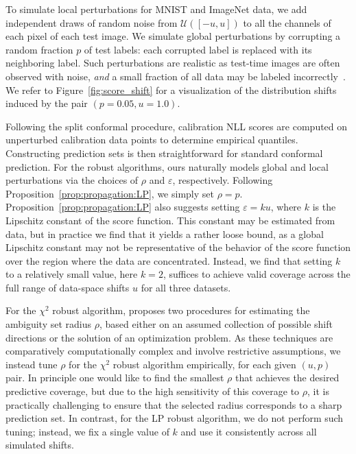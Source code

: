 \documentclass[11pt,a4paper]{article}
\begin{document}
To simulate local perturbations for MNIST and ImageNet data, we add independent draws of random noise from $\mathcal{U}([-u, u])$ to all the channels of each pixel of each test image. We simulate global perturbations by corrupting a random fraction $p$ of test labels: each corrupted label is replaced with its neighboring label. Such perturbations are realistic as test-time images are often observed with noise, \textit{and} a small fraction of all data may be labeled incorrectly~\cite{Feldman_2023, Zargarbashi_2024}. We refer to Figure~\ref{fig:score_shift} for a visualization of the distribution shifts induced by the pair $(p =0.05, u=1.0)$.

Following the split conformal procedure, calibration NLL scores are computed on unperturbed calibration data points to determine empirical quantiles. Constructing prediction sets is then straightforward for standard conformal prediction. For the robust algorithms, ours naturally models global and local perturbations via the choices of $\rho$ and $\varepsilon$, respectively. 
%
Following Proposition~\ref{prop:propagation:LP}, we simply set $\rho = p$. Proposition~\ref{prop:propagation:LP} also suggests setting $\varepsilon = ku$, where $k$ is the Lipschitz constant of the score function. This constant may be estimated from data, but in practice we find that it yields a rather loose bound, as a global Lipschitz constant may not be representative of the behavior of the score function over the region where the data are concentrated. Instead, we find that setting $k$ to a relatively small value, here $k=2$, suffices to achieve valid coverage across the full range of data-space shifts $u$ for all three datasets. 

For the $\chi^2$ robust algorithm, \cite{cauchois2024robust} proposes two procedures for estimating the ambiguity set radius $\rho$, based either on an assumed collection of possible shift directions or the solution of an optimization problem. 
%
%
%
As these techniques are comparatively computationally complex and involve restrictive assumptions, we instead tune $\rho$ for the $\chi^2$ robust algorithm empirically, for each given $(u, p)$ pair. In principle one would like to find the smallest $\rho$ that achieves the desired predictive coverage, but due to the high sensitivity of this coverage to $\rho$, it is practically challenging to ensure that the selected radius corresponds to a sharp prediction set. In contrast, for the LP robust algorithm, we do not perform such tuning; instead, we fix a single value of $k$ and use it consistently across all simulated shifts. 
\end{document}

